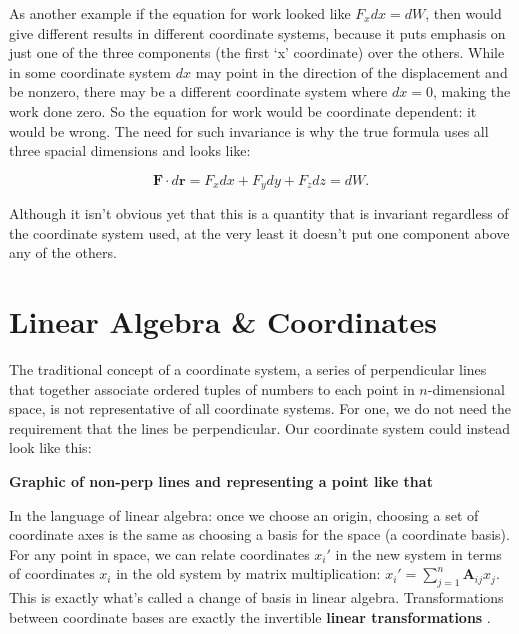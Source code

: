 \documentclass[../master.tex]{subfiles}
\begin{document}
	
	As another example if the equation for work looked like $F_x dx = dW$, then would give different results in different coordinate systems, because it puts emphasis on just one of the three components (the first `x' coordinate) over the others. While in some coordinate system $dx$ may point in the direction of the displacement and be nonzero, there may be a different coordinate system where $dx=0$, making the work done zero. So the equation for work would be coordinate dependent: it would be wrong. The need for such invariance is why the true formula uses all three spacial dimensions and looks like:
	
	\begin{equation*}
		\mathbf F \cdot  d \mathbf r = F_x dx + F_y dy + F_z dz = d W.
	\end{equation*}
	
	 Although it isn't obvious yet that this is a quantity that is invariant regardless of the coordinate system used, at the very least it doesn't put one component above any of the others.

	
	
	\section{Linear Algebra \& Coordinates} 
	\label{sec:Linear Algebra & Coordinates}%
	
	
	The traditional concept of a coordinate system, a series of perpendicular lines that together associate ordered tuples of numbers to each point in $n$-dimensional space, is not representative of all coordinate systems. For one, we do not need the requirement that the lines be perpendicular. Our coordinate system could instead look like this:
	
	\textbf{Graphic of non-perp lines and representing a point like that}
	
	In the language of linear algebra: once we choose an origin, choosing a set of coordinate axes is the same as choosing a basis for the space (a coordinate basis). For any point in space, we can relate coordinates $x_i'$ in the new system in terms of coordinates $x_i$ in the old system by matrix multiplication: $x_i' = \sum_{j=1}^n \mathbf A_{ij} x_j$. This is exactly what's called a change of basis in linear algebra. Transformations between coordinate bases are exactly the invertible \textbf{linear transformations} .
	
\end{document}
